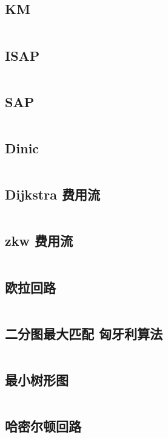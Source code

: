 \documentclass[titlepage,landscape,a4paper,10pt]{article}
\begin{document}
\begin{multicols}{2}
\begin{spacing}{0.8}
\subsection{KM}
\inputminted{cpp}{Graph/KM.cpp}

\subsection{ISAP}
\inputminted{cpp}{Graph/ISAP.cpp}

\subsection{SAP}
\inputminted{cpp}{Graph/SAP.cpp}

\subsection{Dinic}
\inputminted{cpp}{Graph/dinic.cpp}

\subsection{Dijkstra 费用流}
\inputminted{cpp}{Graph/MinCostFlow.cpp}

\subsection{zkw 费用流}
\inputminted{cpp}{Graph/zkw费用流.cpp}

\subsection{欧拉回路}
\inputminted{cpp}{Graph/欧拉回路.cpp}

\subsection{二分图最大匹配 匈牙利算法}
\inputminted{cpp}{Graph/匈牙利算法.cpp}

\subsection{最小树形图}
\inputminted{cpp}{Graph/朱刘.cpp}

\subsection{哈密尔顿回路}
\inputminted{cpp}{Graph/哈密尔顿回路.cpp}


\end{spacing}
\end{multicols}
\end{document}
